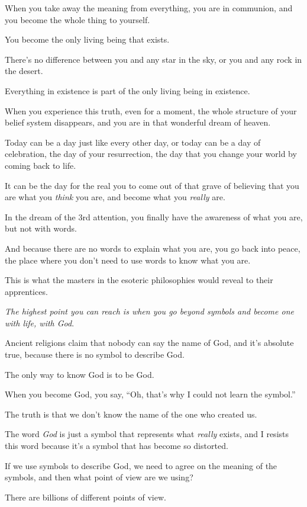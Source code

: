 \documentclass{article}
\numberwithin{equation}{section}
\begin{document}
When you take away the meaning from everything, you are in communion, and you become the whole thing to yourself.

You become the only living being that exists.

There's no difference between you and any star in the sky, or you and any rock in the desert.

Everything in existence is part of the only living being in existence.

When you experience this truth, even for a moment, the whole structure of your belief system disappears, and you are in that wonderful dream of heaven.

%
Today can be a day just like every other day, or today can be a day of celebration, the day of your resurrection, the day that you change your world by coming back to life.

It can be the day for the real you to come out of that grave of believing that you are what you \textit{think} you are, and become what you \textit{really} are.

%
In the dream of the 3rd attention, you finally have the awareness of what you are, but not with words.

And because there are no words to explain what you are, you go back into peace, the place where you don't need to use words to know what you are.

This is what the masters in the esoteric philosophies would reveal to their apprentices.

\textit{The highest point you can reach is when you go beyond symbols and become one with life, with God}.

%
Ancient religions claim that nobody can say the name of God, and it's absolute true, because there is no symbol to describe God.

The only way to know God is to be God.

When you become God, you say, ``Oh, that's why I could not learn the symbol.''

The truth is that we don't know the name of the one who created us.

The word \textit{God} is just a symbol that represents what \textit{really} exists, and I resists this word because it's a symbol that has become so distorted.

If we use symbols to describe God, we need to agree on the meaning of the symbols, and then what point of view are we using?

There are billions of different points of view.
\end{document}
